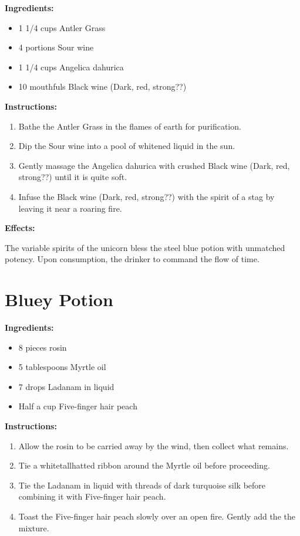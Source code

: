 \documentclass{article}
\begin{document}
\textbf{Ingredients:}

\begin{itemize}
  \item 1 1/4 cups Antler Grass
  \item 4 portions Sour wine
  \item 1 1/4 cups Angelica dahurica
  \item 10 mouthfuls Black wine (Dark, red, strong??)
\end{itemize}

\textbf{Instructions:}

\begin{enumerate}
  \item Bathe the Antler Grass in the flames of earth for purification.
  \item Dip the Sour wine into a pool of whitened liquid in the sun.
  \item Gently massage the Angelica dahurica with crushed Black wine (Dark, red, strong??) until it is quite soft.
  \item Infuse the Black wine (Dark, red, strong??) with the spirit of a stag by leaving it near a roaring fire.
\end{enumerate}

\textbf{Effects:}

The variable spirits of the unicorn bless the steel blue potion with unmatched potency. Upon consumption, the drinker to command the flow of time.

\newpage
\section*{Bluey Potion}

\textbf{Ingredients:}

\begin{itemize}
  \item 8 pieces rosin
  \item 5 tablespoons Myrtle oil
  \item 7 drops Ladanam in liquid
  \item Half a cup Five-finger hair peach
\end{itemize}

\textbf{Instructions:}

\begin{enumerate}
  \item Allow the rosin to be carried away by the wind, then collect what remains.
  \item Tie a whitetallhatted ribbon around the Myrtle oil before proceeding.
  \item Tie the Ladanam in liquid with threads of dark turquoise silk before combining it with Five-finger hair peach.
  \item Toast the Five-finger hair peach slowly over an open fire. Gently add the the mixture.
\end{enumerate}
\end{document}
